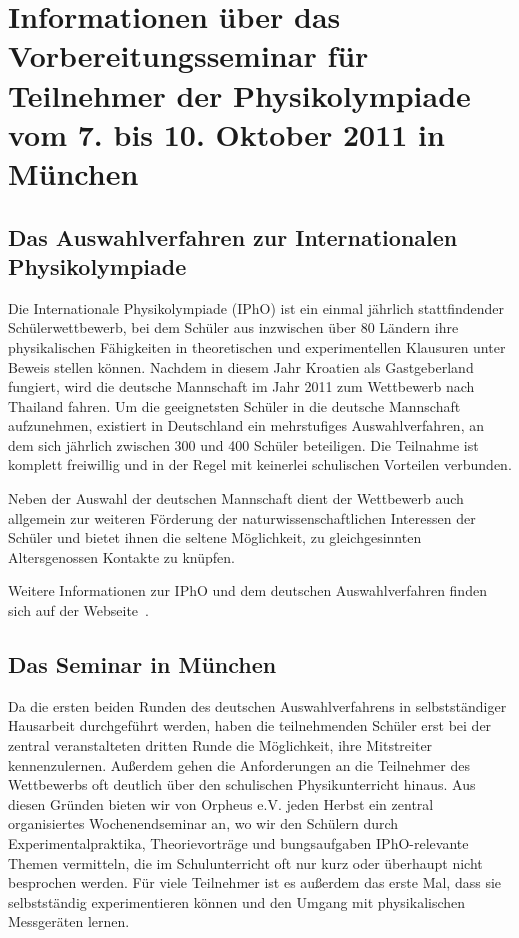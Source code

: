 \documentclass[DIV13,11pt,a4paper,headinclude]{scrartcl}
\begin{document}
\setlength{\parindent}{0pt}
\setlength{\parskip}{0.5\baselineskip}

\section*{Informationen \"uber das Vorbereitungsseminar f\"ur Teilnehmer der Physikolympiade vom 7. bis 10. Oktober 2011 in M\"unchen}

\subsection*{Das Auswahlverfahren zur Internationalen Physikolympiade}

Die Internationale Physikolympiade (IPhO) ist ein einmal j\"ahrlich
stattfindender Sch\"ulerwettbewerb, bei dem Sch\"uler aus inzwischen \"uber 80
L\"andern ihre physikalischen F\"ahigkeiten in theoretischen und experimentellen
Klausuren unter Beweis stellen k\"onnen. Nachdem in diesem Jahr Kroatien als
Gastgeberland fungiert, wird die deutsche Mannschaft im Jahr 2011 zum
Wettbewerb nach Thailand fahren. Um die geeignetsten Sch\"uler in die deutsche
Mannschaft aufzunehmen, existiert in Deutschland ein mehrstufiges
Auswahlverfahren, an dem sich j\"ahrlich zwischen 300 und 400 Sch\"uler
beteiligen. Die Teilnahme ist komplett freiwillig und in der Regel mit
keinerlei schulischen Vorteilen verbunden.

Neben der Auswahl der deutschen Mannschaft dient der Wettbewerb auch allgemein
zur weiteren F\"orderung der naturwissenschaftlichen Interessen der Sch\"uler und
bietet ihnen die seltene M\"oglichkeit, zu gleichgesinnten Altersgenossen
Kontakte zu kn\"upfen.

Weitere Informationen zur IPhO und dem deutschen Auswahlverfahren finden sich
auf der Webseite~\cite{iphoweb}.

\subsection*{Das Seminar in M\"unchen}

Da die ersten beiden Runden des deutschen Auswahlverfahrens in selbstst\"andiger
Hausarbeit durchgef\"uhrt werden, haben die teilnehmenden Sch\"uler erst bei der
zentral veranstalteten dritten Runde die M\"oglichkeit, ihre Mitstreiter
kennenzulernen. Au\ss erdem gehen die Anforderungen an die Teilnehmer des
Wettbewerbs oft deutlich \"uber den schulischen Physikunterricht hinaus.
Aus diesen Gr\"unden bieten wir von Orpheus e.V. jeden Herbst ein zentral
organisiertes Wochenendseminar an, wo wir den Sch\"ulern durch Experimentalpraktika,
Theorievortr\"age und bungsaufgaben IPhO-relevante Themen vermitteln, die im
Schulunterricht oft nur kurz oder \"uberhaupt nicht besprochen werden. F\"ur viele
Teilnehmer ist es au\ss erdem das erste Mal, dass sie selbstst\"andig
experimentieren k\"onnen und den Umgang mit physikalischen Messger\"aten lernen.
\end{document}
